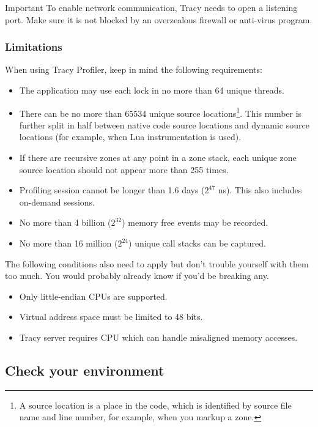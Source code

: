 \documentclass[hidelinks,titlepage,a4paper,twoside]{article}
\begin{document}
\begin{bclogo}[
noborder=true,
couleur=black!5,
logo=\bcbombe
]{Important}
To enable network communication, Tracy needs to open a listening port. Make sure it is not blocked by an overzealous firewall or anti-virus program.
\end{bclogo}

\subsubsection{Limitations}

When using Tracy Profiler, keep in mind the following requirements:

\begin{itemize}
\item The application may use each lock in no more than 64 unique threads.
\item There can be no more than 65534 unique source locations\footnote{A source location is a place in the code, which is identified by source file name and line number, for example, when you markup a zone.}. This number is further split in half between native code source locations and dynamic source locations (for example, when Lua instrumentation is used).
\item If there are recursive zones at any point in a zone stack, each unique zone source location should not appear more than 255 times.
\item Profiling session cannot be longer than 1.6 days ($2^{47}$ \si{\nano\second}). This also includes on-demand sessions.
\item No more than 4 billion ($2^{32}$) memory free events may be recorded.
\item No more than 16 million ($2^{24}$) unique call stacks can be captured.
\end{itemize}

The following conditions also need to apply but don't trouble yourself with them too much. You would probably already know if you'd be breaking any.

\begin{itemize}
\item Only little-endian CPUs are supported.
\item Virtual address space must be limited to 48 bits.
\item Tracy server requires CPU which can handle misaligned memory accesses.
\end{itemize}

\subsection{Check your environment}
\end{document}
